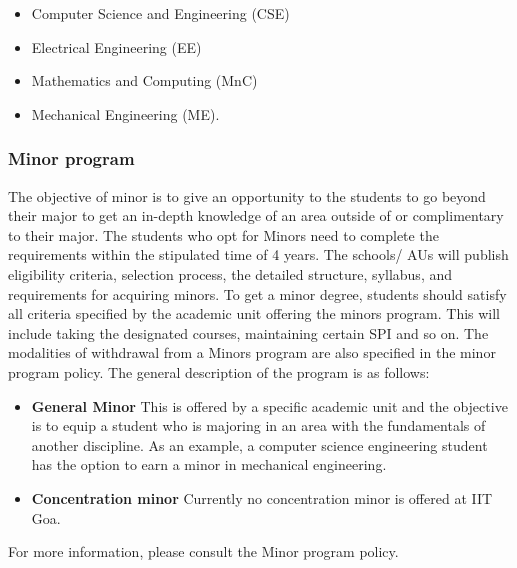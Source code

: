 \documentclass[a4paper, 12pt]{article}
\begin{document}
\begin{itemize}
	\item Computer Science and Engineering (CSE)
	\item Electrical Engineering (EE)
	\item Mathematics and Computing (MnC)
	\item Mechanical Engineering (ME).
\end{itemize}

\subsubsection{Minor program}

The objective of minor is to give an opportunity to the students to go beyond their major to get an in-depth knowledge of an area outside of or complimentary to their major. The students who opt for Minors need to complete the requirements within the stipulated time of 4 years. The schools/ AUs will publish eligibility criteria, selection process, the detailed structure, syllabus, and requirements for acquiring minors. To get a minor degree, students should satisfy all criteria specified by the academic unit offering the minors program. This will include taking the designated courses, maintaining certain SPI and so on. The modalities of withdrawal from a Minors program are also specified in the minor program policy. The general description of the program is as follows: 

\begin{itemize}
	\item \textbf{General Minor} This is offered by a specific academic unit and the objective is to equip a student who is majoring in an area with the fundamentals of another discipline. As an example, a computer science engineering student has the option to earn a minor in mechanical engineering.
	\item \textbf{Concentration minor} Currently no concentration minor is offered at IIT Goa.
\end{itemize}

For more information, please consult the Minor program policy.
	
	
\end{document}
